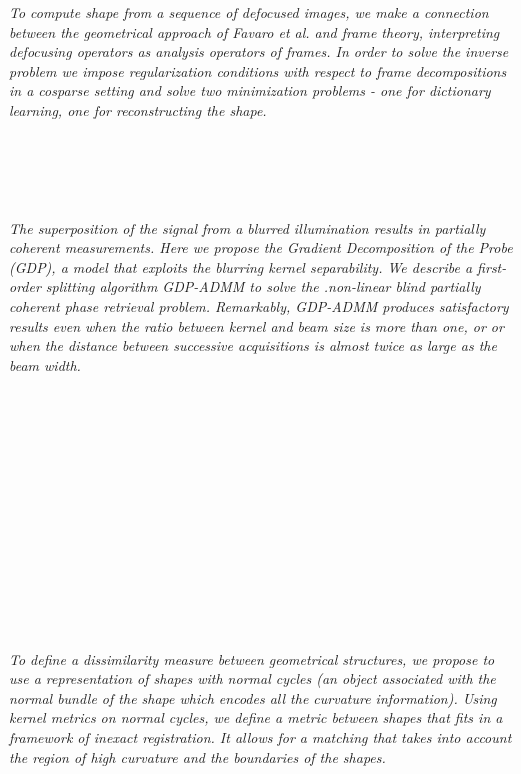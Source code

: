   \begin{multicols}{2}
    \textit{To compute shape from a sequence of defocused images, we make a connection between the geometrical approach of Favaro et al.  and frame theory, interpreting  defocusing operators as analysis operators of  frames.  In order to solve the inverse problem we impose regularization conditions with respect to frame decompositions in a cosparse setting and solve two minimization problems - one for dictionary learning, one for reconstructing the shape.}\\
\\ 
      \\
      \\\\
\\
    \textit{The superposition of the  signal from a blurred illumination results in partially coherent measurements. Here we propose the Gradient Decomposition of the Probe (GDP), a model that exploits the blurring kernel separability. We describe a first-order splitting algorithm GDP-ADMM to solve the .non-linear blind partially coherent phase retrieval problem. Remarkably, GDP-ADMM produces satisfactory results even when the ratio between kernel and beam size is more than one, or or when the distance between successive acquisitions is almost twice as large as the beam width.}\\
\\ 
      \\
      \\\\
      \\
      \\\\
      \\
      \\\\
      \\
      \\\\
\\
    \textit{To define a dissimilarity measure between geometrical structures, we propose to use a representation of shapes with normal cycles (an object associated with the normal bundle of the shape which encodes all the curvature information). Using kernel metrics on normal cycles, we define a metric between shapes that fits in a framework of inexact registration. It allows for a matching that takes into account the region of high curvature and the boundaries of the shapes.}\\

\end{multicols}
